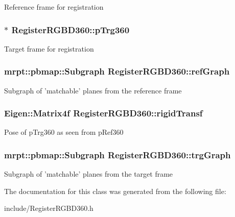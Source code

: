 Reference frame for registration \hypertarget{classRegisterRGBD360_a9ce56d7214d0f133c77f58fc3530e89a}{
\subsubsection[{p\-Trg360}]{$\ast$ Register\-R\-G\-B\-D360\-::p\-Trg360\hspace{0.3cm}{\ttfamily [private]}}}\label{classRegisterRGBD360_a9ce56d7214d0f133c77f58fc3530e89a}
Target frame for registration \hypertarget{classRegisterRGBD360_a203bdc0dc64df15f3ec48e43957c62fc}{
\subsubsection[{ref\-Graph}]{\setlength{\rightskip}{0pt plus 5cm}mrpt\-::pbmap\-::\-Subgraph Register\-R\-G\-B\-D360\-::ref\-Graph\hspace{0.3cm}{\ttfamily [private]}}}\label{classRegisterRGBD360_a203bdc0dc64df15f3ec48e43957c62fc}
Subgraph of 'matchable' planes from the reference frame \hypertarget{classRegisterRGBD360_ac096bcae62d7e9db6dac8335a4f19e70}{
\subsubsection[{rigid\-Transf}]{\setlength{\rightskip}{0pt plus 5cm}Eigen\-::\-Matrix4f Register\-R\-G\-B\-D360\-::rigid\-Transf\hspace{0.3cm}{\ttfamily [private]}}}\label{classRegisterRGBD360_ac096bcae62d7e9db6dac8335a4f19e70}
Pose of p\-Trg360 as seen from p\-Ref360 \hypertarget{classRegisterRGBD360_ab91b2df6d1b7d557fc1a81278ecf15fa}{
\subsubsection[{trg\-Graph}]{\setlength{\rightskip}{0pt plus 5cm}mrpt\-::pbmap\-::\-Subgraph Register\-R\-G\-B\-D360\-::trg\-Graph\hspace{0.3cm}{\ttfamily [private]}}}\label{classRegisterRGBD360_ab91b2df6d1b7d557fc1a81278ecf15fa}
Subgraph of 'matchable' planes from the target frame 

The documentation for this class was generated from the following file\-:\begin{DoxyCompactItemize}
\item 
include/Register\-R\-G\-B\-D360.\-h\end{DoxyCompactItemize}
